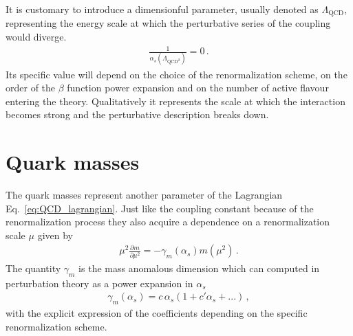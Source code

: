 It is customary to introduce a dimensionful parameter, usually denoted as $\Lambda_{\text{QCD}}$, representing the energy 
scale at which the perturbative series of the coupling would diverge.
\begin{align}
    \label{eq:lambda_QCD}
    \frac{1}{\alpha_s\left(\Lambda_{\text{QCD}^2}\right)} = 0\,.
\end{align}
Its specific value will depend on the choice of the renormalization scheme, on the order
of the $\beta$ function power expansion and on the number of active flavour entering the theory.
Qualitatively it represents the scale at which the interaction becomes strong and the perturbative description breaks down.

\section{Quark masses}
The quark masses represent another parameter of the Lagrangian Eq.~\ref{eq:QCD_lagrangian}.
Just like the coupling constant because of the renormalization process they also acquire a
dependence on a renormalization scale $\mu$ given by 
\begin{align}
    \label{eq:renormalization_mass}
    \mu^2\frac{\partial m }{\partial \mu^2} = - \gamma_m\left(\alpha_s\right)m\left(\mu^2\right)\,.
\end{align}
The quantity $\gamma_m$ is the mass anomalous dimension which can computed in perturbation theory as
a power expansion in $\alpha_s$
\begin{align}
    \gamma_m\left(\alpha_s\right) = c\,\alpha_s\left(1+c'\alpha_s + ...\right)\,,
\end{align}
with the explicit expression of the coefficients depending on the specific renormalization scheme.

